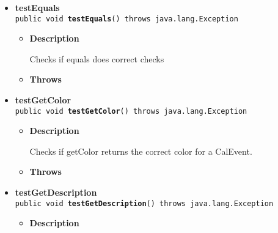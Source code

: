 \documentclass[11pt,a4paper]{report}
\begin{document}
{{{\begin{itemize}
{\begin{itemize}
{Creates a CalEvent with start date same as end date. Expects IllegalArgumentException.
}
\item{{\bf  Throws}
}%
\end{itemize}
}%
\item{ 
{\bf  testEquals}\\
\texttt{public void\ {\bf  testEquals}() throws java.lang.Exception
\label{is.mpg.ruglan.test.CalEventTest.testEquals()}}%
\begin{itemize}
\item{
{\bf  Description}

Checks if equals does correct checks
}
\item{{\bf  Throws}
}%
\end{itemize}
}%
\item{ 
{\bf  testGetColor}\\
\texttt{public void\ {\bf  testGetColor}() throws java.lang.Exception
\label{is.mpg.ruglan.test.CalEventTest.testGetColor()}}%
\begin{itemize}
\item{
{\bf  Description}

Checks if getColor returns the correct color for a CalEvent.
}
\item{{\bf  Throws}
}%
\end{itemize}
}%
\item{ 
{\bf  testGetDescription}\\
\texttt{public void\ {\bf  testGetDescription}() throws java.lang.Exception
\label{is.mpg.ruglan.test.CalEventTest.testGetDescription()}}%
\begin{itemize}
\item{
{\bf  Description}

}
\end{itemize}}
\end{itemize}}}}
\end{document}

